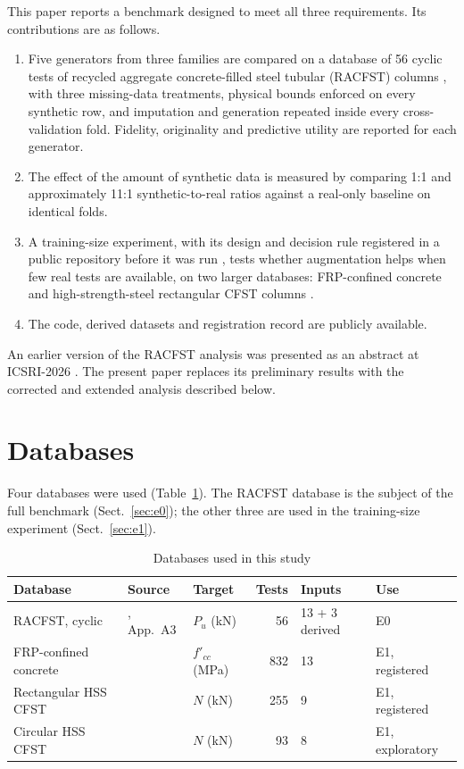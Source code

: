 \documentclass[pdflatex,sn-basic]{sn-jnl}
\begin{document}
This paper reports a benchmark designed to meet all three requirements. Its contributions are as follows.
\begin{enumerate}
\item Five generators from three families are compared on a database of 56 cyclic tests of recycled aggregate
concrete-filled steel tubular (RACFST) columns \citep{xu2020racfst}, with three missing-data treatments, physical
bounds enforced on every synthetic row, and imputation and generation repeated inside every cross-validation
fold. Fidelity, originality and predictive utility are reported for each generator.
\item The effect of the amount of synthetic data is measured by comparing 1:1 and approximately 11:1
synthetic-to-real ratios against a real-only baseline on identical folds.
\item A training-size experiment, with its design and decision rule registered in a public repository before it
was run \citep{nosek2018prereg}, tests whether augmentation helps when few real tests are available, on two
larger databases: FRP-confined concrete \citep{ozbakkaloglu2013database} and high-strength-steel rectangular CFST
columns \citep{thai2021reliability}.
\item The code, derived datasets and registration record are publicly available.
\end{enumerate}
An earlier version of the RACFST analysis was presented as an abstract at ICSRI-2026 \citep{dubey2026icsri}. The
present paper replaces its preliminary results with the corrected and extended analysis described below.

\section{Databases}\label{sec:data}

Four databases were used (Table~\ref{tab:data}). The RACFST database is the subject of the full benchmark
(Sect.~\ref{sec:e0}); the other three are used in the training-size experiment (Sect.~\ref{sec:e1}).

\begin{table}[t]
\caption{Databases used in this study}\label{tab:data}
\footnotesize
\setlength{\tabcolsep}{3pt}
\begin{tabular*}{\textwidth}{@{\extracolsep\fill}lllrll@{}}
\toprule
Database & Source & Target & Tests & Inputs & Use \\
\midrule
RACFST, cyclic & \citet{xu2020racfst}, App.\ A3 & $P_u$ (kN) & 56 & 13 + 3 derived & E0 \\
FRP-confined concrete & \citet{ozbakkaloglu2013database} & $f'_{cc}$ (MPa) & 832 & 13 & E1, registered \\
Rectangular HSS CFST & \citet{thai2021reliability} & $N$ (kN) & 255 & 9 & E1, registered \\
Circular HSS CFST & \citet{thai2021reliability} & $N$ (kN) & 93 & 8 & E1, exploratory \\
\bottomrule
\end{tabular*}
\end{table}
\end{document}
